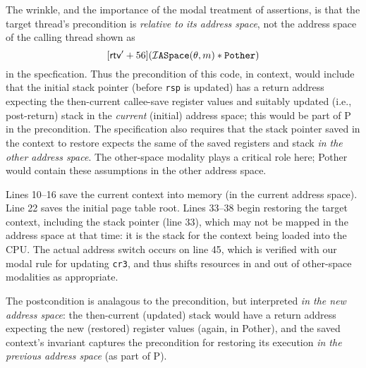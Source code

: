 The wrinkle, and the importance of the modal treatment of assertions, is that the target thread's precondition is \emph{relative to its address space}, not the address space of the calling thread shown as 
\[[\textsf{rtv}'+56](\mathcal{I}\texttt{ASpace}(\theta,m) \ast \texttt{Pother})\]
in the specfication. 
Thus the precondition of this code,
in context, would include that the initial stack pointer (before \lstinline|rsp| is updated)
has a return address expecting the then-current callee-save register values and 
suitably updated (i.e., post-return) stack in the \emph{current} (initial) address space;
this would be part of \textsf{P} in the precondition.
The specification also requires that
the stack pointer saved in the context to restore expects the same of the saved registers and stack 
\emph{in the other address space}. 
The other-space modality plays a critical role here; \textsf{Pother} would contain these assumptions in the other
address space.

Lines 10--16 save the current context into memory (in the current address space).
Line 22 saves the initial page table root.
Lines 33--38 begin restoring the target context, including the stack pointer (line 33),
which may not be mapped in the address space at that time: it is the stack for the context being
loaded into the CPU.
The actual address switch occurs on line 45, which is verified with our modal rule for updating \lstinline|cr3|,
and thus shifts resources in and out of other-space modalities as appropriate.

The postcondition is analagous to the precondition, but interpreted \emph{in the new address space}: the then-current (updated) stack would have a return address expecting the new (restored) register values (again, in \textsf{Pother}),
and the saved context's invariant captures the precondition for restoring its execution \emph{in the previous address space} (as part of \textsf{P}). 

